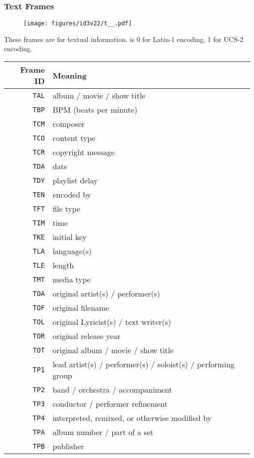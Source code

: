 \subsubsection{Text Frames}
\begin{figure}[h]
\texttt{[image: figures/id3v22/t\_\_.pdf]}
\end{figure}
These frames are for textual information.
 is 0 for Latin-1 encoding, 1 for UCS-2 encoding.
\begin{table}[h]
{
\begin{tabular}{|r|l|}
\hline
Frame ID & Meaning \\
\hline
\texttt{TAL} & album / movie / show title \\
\texttt{TBP} & BPM (beats per minute) \\
\texttt{TCM} & composer \\
\texttt{TCO} & content type \\
\texttt{TCR} & copyright message \\
\texttt{TDA} & date \\
\texttt{TDY} & playlist delay \\
\texttt{TEN} & encoded by \\
\texttt{TFT} & file type \\
\texttt{TIM} & time \\
\texttt{TKE} & initial key \\
\texttt{TLA} & language(s) \\
\texttt{TLE} & length \\
\texttt{TMT} & media type \\
\texttt{TOA} & original artist(s) / performer(s) \\
\texttt{TOF} & original filename \\
\texttt{TOL} & original Lyricist(s) / text writer(s) \\
\texttt{TOR} & original release year \\
\texttt{TOT} & original album / movie / show title \\
\texttt{TP1} & lead artist(s) / performer(s) / soloist(s) / performing group \\
\texttt{TP2} & band / orchestra / accompaniment \\
\texttt{TP3} & conductor / performer refinement \\
\texttt{TP4} & interpreted, remixed, or otherwise modified by \\
\texttt{TPA} & album number / part of a set \\
\texttt{TPB} & publisher \\

\end{tabular}}
\end{table}
